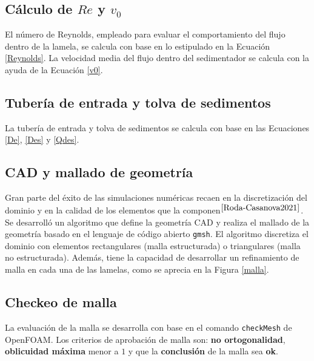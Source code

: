 \subsection{C\'alculo de $Re$ y $v_0$} \label{Rev0}

\noindent
\justify

El n\'umero de Reynolds, empleado para evaluar el comportamiento del flujo dentro de la lamela, se calcula con base en lo estipulado en la Ecuaci\'on \ref{Reynolds}. La velocidad media del flujo dentro del sedimentador se calcula con la ayuda de la Ecuaci\'on \ref{v0}.

\subsection{Tuber\'ia de entrada y tolva de sedimentos} \label{enTol}

\noindent
\justify

La tuber\'ia de entrada y tolva de sedimentos se calcula con base en las Ecuaciones \ref{De}, \ref{Des} y \ref{Qdes}.

\subsection{CAD y mallado de geometr\'ia}

\noindent
\justify

Gran parte del \'exito de las simulaciones num\'ericas recaen en la discretizaci\'on del dominio y en la calidad de los elementos que la componen$^{\cite{Roda-Casanova2021}}$. Se desarroll\'o un algoritmo que define la geometr\'ia CAD y realiza el mallado de la geometr\'ia basado en el lenguaje de c\'odigo abierto \texttt{gmsh}. El algoritmo discretiza el dominio con elementos rectangulares (malla estructurada) o triangulares (malla no estructurada). Adem\'as, tiene la capacidad de desarrollar un refinamiento de malla en cada una de las lamelas, como se aprecia en la Figura \ref{malla}.

\subsection{Checkeo de malla}

\noindent
\justify

La evaluaci\'on de la malla se desarrolla con base en el comando \texttt{checkMesh} de OpenFOAM. Los criterios de aprobaci\'on de malla son: \textbf{no ortogonalidad}, \textbf{oblicuidad m\'axima} menor a $1$ y que la \textbf{conclusi\'on} de la malla sea \textbf{ok}.

